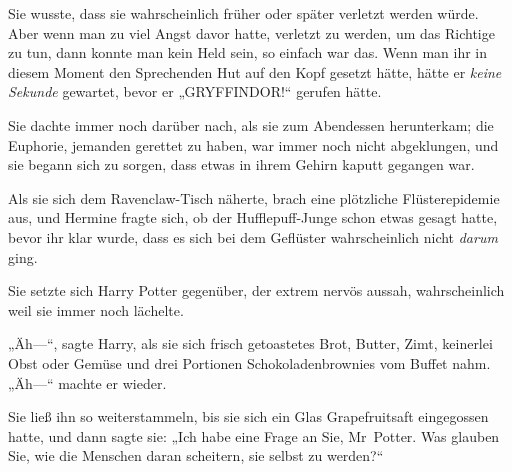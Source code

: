 Sie wusste, dass sie wahrscheinlich früher oder später verletzt werden würde. Aber wenn man zu viel Angst davor hatte, verletzt zu werden, um das Richtige zu tun, dann konnte man kein Held sein, so einfach war das. Wenn man ihr in diesem Moment den Sprechenden Hut auf den Kopf gesetzt hätte, hätte er \emph{keine Sekunde} gewartet, bevor er „GRYFFINDOR!“ gerufen hätte.

\later

Sie dachte immer noch darüber nach, als sie zum Abendessen herunterkam; die Euphorie, jemanden gerettet zu haben, war immer noch nicht abgeklungen, und sie begann sich zu sorgen, dass etwas in ihrem Gehirn kaputt gegangen war.

Als sie sich dem Ravenclaw-Tisch näherte, brach eine plötzliche Flüsterepidemie aus, und Hermine fragte sich, ob der Hufflepuff-Junge schon etwas gesagt hatte, bevor ihr klar wurde, dass es sich bei dem Geflüster wahrscheinlich nicht \emph{darum} ging.

Sie setzte sich Harry Potter gegenüber, der extrem nervös aussah, wahrscheinlich weil sie immer noch lächelte.

„Äh—“, sagte Harry, als sie sich frisch getoastetes Brot, Butter, Zimt, keinerlei Obst oder Gemüse und drei Portionen Schokoladenbrownies vom Buffet nahm. „Äh—“ machte er wieder.

Sie ließ ihn so weiterstammeln, bis sie sich ein Glas Grapefruitsaft eingegossen hatte, und dann sagte sie: „Ich habe eine Frage an Sie, Mr~Potter. Was glauben Sie, wie die Menschen daran scheitern, sie selbst zu werden?“

